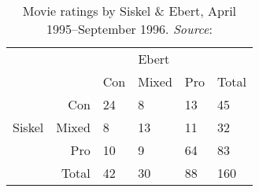 \begin{table}[!htb]
\centering
\caption{Movie ratings by Siskel \& Ebert, April 1995--September 1996. \emph{Source}: \citet{AgrestiWinner:1997}}\label{tab:siskel-ebert}
\begin{tabular}{rr|lll|l}
        &       &  \multicolumn{3}{|c|}{Ebert} \\
        &       & Con & Mixed & Pro & Total \\ \hline
        & Con   &  24 &   8   &  13 &  45   \\
 Siskel & Mixed &   8 &  13   &  11 &  32   \\
        & Pro   &  10 &   9   &  64 &  83   \\ \hline
        & Total &  42 &  30   &  88 & 160   \\
\end{tabular}
\end{table}